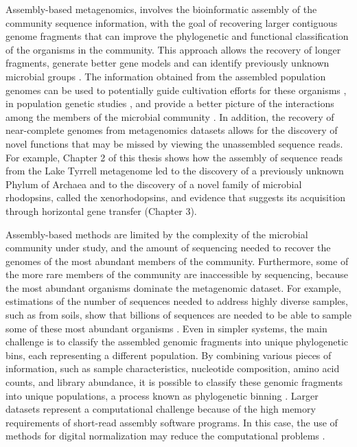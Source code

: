 Assembly-based metagenomics, involves the bioinformatic assembly of the community sequence information, with the goal of recovering larger contiguous genome fragments that can improve the phylogenetic and functional classification of the organisms in the community. This approach allows the recovery of longer fragments, generate better gene models and can identify previously unknown microbial groups \cite{Narasingarao:2012kp,Podell:2013kx,Kantor:2013ir,DiRienzi:2013kx}. The information obtained from the assembled population genomes can be used to potentially guide cultivation efforts for these organisms \cite{Tyson:2005by}, in population genetic studies \cite{Simmons:2008by,Ward:2008hp,Allen:2007ju}, and provide a better picture of the interactions among the members of the microbial community \cite{Tyson:2004bw,Flowers:2013hq}. In addition, the recovery of near-complete genomes from metagenomics datasets allows for the discovery of novel functions that may be missed by viewing the unassembled sequence reads. For example, Chapter 2 of this thesis shows how the assembly of sequence reads from the Lake Tyrrell metagenome led to the discovery of a previously unknown Phylum of Archaea and to the discovery of a novel family of microbial rhodopsins, called the xenorhodopsins, and evidence that suggests its acquisition through horizontal gene transfer (Chapter 3).

Assembly-based methods are limited by the complexity of the microbial community under study, and the amount of sequencing needed to recover the genomes of the most abundant members of the community. Furthermore, some of the more rare members of the community are inaccessible by sequencing, because the most abundant organisms dominate the metagenomic dataset.  For example, estimations of the number of sequences needed to address highly diverse samples, such as from soils, show that billions of sequences are needed to be able to sample some of these most abundant organisms \cite{Howe:2014go}. Even in simpler systems, the main challenge is to classify the assembled genomic fragments into unique phylogenetic bins, each representing a different population. By combining various pieces of information, such as sample characteristics, nucleotide composition, amino acid counts, and library abundance, it is possible to classify these genomic fragments into unique populations, a process known as phylogenetic binning \cite{Podell:2013kx,Albertsen:2013gp}. Larger datasets represent a computational challenge because of the high memory requirements of short-read assembly software programs. In this case, the use of methods for digital normalization may reduce the computational problems \cite{Pell:2012id,Kakirde:2010ew}.

